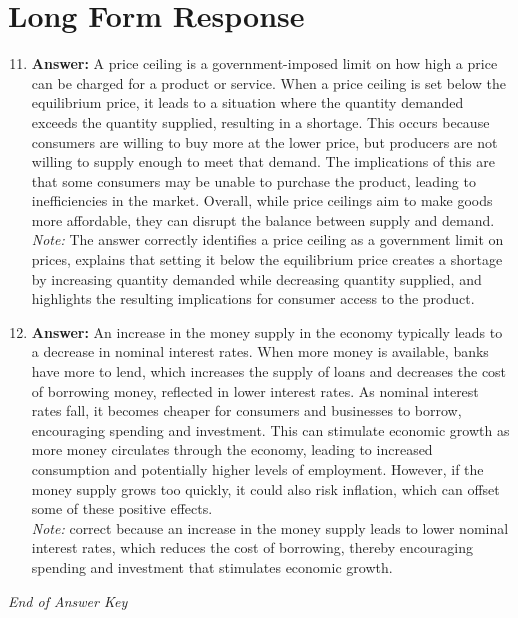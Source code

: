 \documentclass[12pt]{article}
\begin{document}
\section*{Long Form Response}
\begin{enumerate}[label=\arabic*.]
\setcounter{enumi}{10}
\item \textbf{Answer:} A price ceiling is a government-imposed limit on how high a price can be charged for a product or service. When a price ceiling is set below the equilibrium price, it leads to a situation where the quantity demanded exceeds the quantity supplied, resulting in a shortage. This occurs because consumers are willing to buy more at the lower price, but producers are not willing to supply enough to meet that demand. The implications of this are that some consumers may be unable to purchase the product, leading to inefficiencies in the market. Overall, while price ceilings aim to make goods more affordable, they can disrupt the balance between supply and demand.
\\ \textit{Note:} The answer correctly identifies a price ceiling as a government limit on prices, explains that setting it below the equilibrium price creates a shortage by increasing quantity demanded while decreasing quantity supplied, and highlights the resulting implications for consumer access to the product.
\item \textbf{Answer:} An increase in the money supply in the economy typically leads to a decrease in nominal interest rates. When more money is available, banks have more to lend, which increases the supply of loans and decreases the cost of borrowing money, reflected in lower interest rates. As nominal interest rates fall, it becomes cheaper for consumers and businesses to borrow, encouraging spending and investment. This can stimulate economic growth as more money circulates through the economy, leading to increased consumption and potentially higher levels of employment. However, if the money supply grows too quickly, it could also risk inflation, which can offset some of these positive effects.
\\ \textit{Note:} correct because an increase in the money supply leads to lower nominal interest rates, which reduces the cost of borrowing, thereby encouraging spending and investment that stimulates economic growth.
\end{enumerate}

\vfill
\noindent\textit{End of Answer Key}
\end{document}
